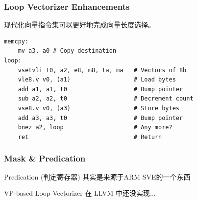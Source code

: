 \documentclass[aspectratio=169]{ctexbeamer}
\begin{document}
\begin{frame}[fragile]
    \frametitle{Loop Vectorizer Enhancements}

    现代化向量指令集可以更好地完成向量长度选择。

    \begin{lstlisting}[language={[RISC-V]Assembler}]
memcpy:
    mv a3, a0 # Copy destination
loop:
    vsetvli t0, a2, e8, m8, ta, ma   # Vectors of 8b
    vle8.v v0, (a1)                  # Load bytes
    add a1, a1, t0                   # Bump pointer
    sub a2, a2, t0                   # Decrement count
    vse8.v v0, (a3)                  # Store bytes
    add a3, a3, t0                   # Bump pointer
    bnez a2, loop                    # Any more?
    ret                              # Return
    \end{lstlisting}

\end{frame}

\begin{frame}
    \frametitle{Mask \& Predication}

    Predication (判定寄存器) 其实是来源于ARM SVE的一个东西

    VP-based Loop Vectorizer 在 LLVM 中还没实现...

\end{frame}
\end{document}
